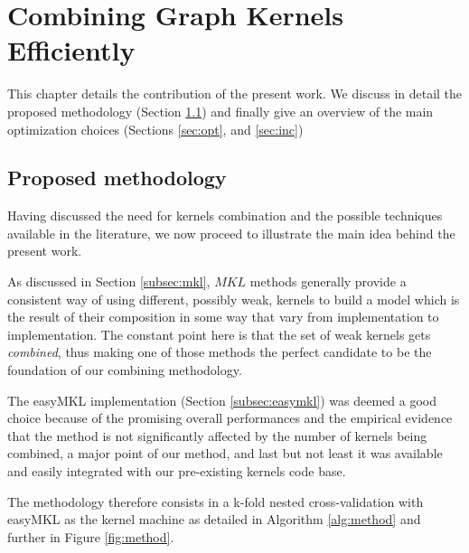 \chapter{Combining Graph Kernels Efficiently}
\label{Chapter3}

This chapter details the contribution of the present work.
We discuss in detail the proposed methodology (Section \ref{sec:meth}) and
finally give an overview of the main optimization choices (Sections
\ref{sec:opt}, and \ref{sec:inc})

\section{Proposed methodology}
\label{sec:meth}

Having discussed the need for kernels combination and the possible techniques
available in the literature, we now proceed to illustrate the main idea behind
the present work.

As discussed in Section \ref{subsec:mkl}, $MKL$ methods generally provide a consistent
way of using different, possibly weak, kernels to build a model which is the result
of their composition in some way that vary from implementation to implementation.
The constant point here is that the set of weak kernels gets \emph{combined}, thus
making one of those methods the perfect candidate to be the foundation of our
combining methodology.

The easyMKL implementation (Section \ref{subsec:easymkl}) was deemed a good
choice because of the promising overall performances and the empirical evidence
that the method is not significantly affected by the number of kernels
being combined, a major point of our method, and last but not least it was
available and easily integrated with our pre-existing kernels code base.

The methodology therefore consists in a k-fold nested cross-validation with
easyMKL as the kernel machine as detailed in Algorithm \ref{alg:method} and further in
Figure \ref{fig:method}.

